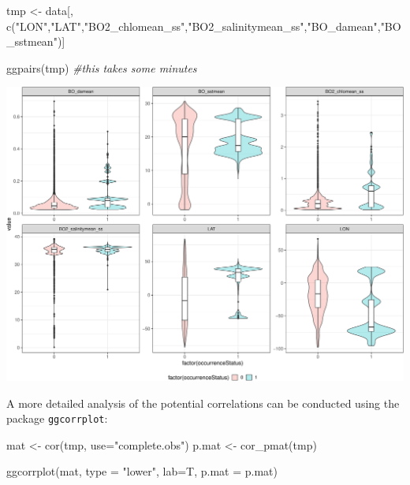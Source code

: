 \documentclass[
]{book}
\newenvironment{Shaded}{\begin{snugshade}}{\end{snugshade}}
\newcommand{\AttributeTok}[1]{\textcolor[rgb]{0.77,0.63,0.00}{#1}}
\newcommand{\CommentTok}[1]{\textcolor[rgb]{0.56,0.35,0.01}{\textit{#1}}}
\newcommand{\FunctionTok}[1]{\textcolor[rgb]{0.00,0.00,0.00}{#1}}
\newcommand{\NormalTok}[1]{#1}
\newcommand{\OtherTok}[1]{\textcolor[rgb]{0.56,0.35,0.01}{#1}}
\newcommand{\StringTok}[1]{\textcolor[rgb]{0.31,0.60,0.02}{#1}}
\begin{document}
\begin{Shaded}
\begin{Highlighting}[]
\NormalTok{tmp }\OtherTok{\textless{}{-}}\NormalTok{ data[, }\FunctionTok{c}\NormalTok{(}\StringTok{"LON"}\NormalTok{,}\StringTok{"LAT"}\NormalTok{,}\StringTok{"BO2\_chlomean\_ss"}\NormalTok{,}\StringTok{"BO2\_salinitymean\_ss"}\NormalTok{,}\StringTok{"BO\_damean"}\NormalTok{,}\StringTok{"BO\_sstmean"}\NormalTok{)]}

\FunctionTok{ggpairs}\NormalTok{(tmp) }\CommentTok{\#this takes some minutes}
\end{Highlighting}
\end{Shaded}

\includegraphics{_main_files/figure-latex/unnamed-chunk-50-1.pdf}

A more detailed analysis of the potential correlations can be conducted using the package \texttt{ggcorrplot}:

\begin{Shaded}
\begin{Highlighting}[]
\NormalTok{mat }\OtherTok{\textless{}{-}} \FunctionTok{cor}\NormalTok{(tmp, }\AttributeTok{use=}\StringTok{"complete.obs"}\NormalTok{) }
\NormalTok{p.mat }\OtherTok{\textless{}{-}} \FunctionTok{cor\_pmat}\NormalTok{(tmp)}

\FunctionTok{ggcorrplot}\NormalTok{(mat, }\AttributeTok{type =} \StringTok{"lower"}\NormalTok{, }\AttributeTok{lab=}\NormalTok{T, }\AttributeTok{p.mat =}\NormalTok{ p.mat)}
\end{Highlighting}
\end{Shaded}
\end{document}
